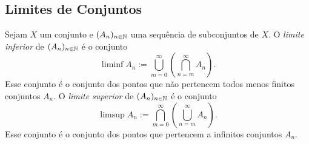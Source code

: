 

\subsection{Limites de Conjuntos}

\begin{defi}
	Sejam $X$ um conjunto e $(A_n)_{n \in \mathbb{N}}$ uma sequência de subconjuntos de $X$. O \emph{limite inferior} de $(A_n)_{n \in \mathbb{N}}$ é o conjunto
	\begin{equation*}
	\liminf A_n := \bigcup_{m=0}^\infty \left( \bigcap_{n=m}^\infty A_n \right).
	\end{equation*}
	Esse conjunto é o conjunto dos pontos que não pertencem todos menos finitos conjuntos $A_n$.
O \emph{limite superior} de $(A_n)_{n \in \mathbb{N}}$ é o conjunto
	\begin{equation*}
	\limsup A_n := \bigcap_{m=0}^\infty \left( \bigcup_{n=m}^\infty A_n \right).
	\end{equation*}
	Esse conjunto é o conjunto dos pontos que pertencem a infinitos conjuntos $A_n$.
\end{defi}

